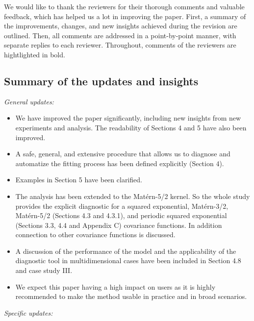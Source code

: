 \documentclass[11pt]{report}
\begin{document}
We would like to thank the reviewers for their thorough comments and valuable feedback, which has helped us a lot in improving the paper. First, a summary of the improvements, changes, and new insights achieved during the revision are outlined. Then, all comments are addressed in a point-by-point manner, with separate replies to each reviewer. 
Throughout, comments of the reviewers are hightlighted in bold.

\noindent \hdashrule{12.5cm}{0.2pt}{2mm 1pt}

\subsection*{Summary of the updates and insights}

\textit{General updates:}

\begin{itemize}

\item We have improved the paper significantly, including new insights from new experiments and analysis. The readability of Sections 4 and 5 have also been improved. 

\item A safe, general, and extensive procedure that allows us to diagnose and automatize the fitting process has been defined explicitly (Section 4). 

\item Examples in Section 5 have been clarified.

\item The analysis has been extended to the Mat\'ern-5/2 kernel. So the whole study provides the explicit diagnostic for a squared exponential, Mat\'ern-3/2, Mat\'ern-5/2 (Sections 4.3 and 4.3.1), and periodic squared exponential (Sections 3.3, 4.4 and Appendix C) covariance functions. In addition connection to other covariance functions is discussed.

\item A discussion of the performance of the model and the applicability of the diagnostic tool in multidimensional cases have been included in Section 4.8 and case study III.

\item We expect this paper having a high impact on users as it is highly recommended to make the method usable in practice and in broad scenarios.

\end{itemize}

\noindent \textit{Specific updates:}
\end{document}
